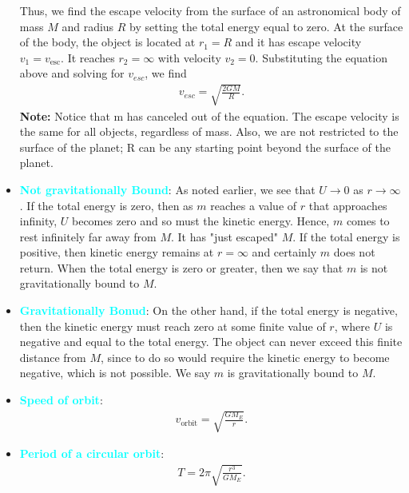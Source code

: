 \documentclass{report}
\begin{document}
\begin{itemize}
            \bigbreak \noindent 
            Thus, we find the escape velocity from the surface of an astronomical body of mass \(M\) and radius \(R\) by setting the total energy equal to zero. At the surface of the body, the object is located at \(r_1 = R\) and it has escape velocity \(v_1 = v_{\text{esc}}\). It reaches \(r_2 = \infty\) with velocity \(v_2 = 0\). Substituting the equation above and solving for $v_{esc}$, we find
            \begin{align*}
                v_{esc} = \sqrt{\frac{2GM}{R}}
            .\end{align*}
            \bigbreak \noindent 
            \textbf{Note:} Notice that m has canceled out of the equation. The escape velocity is the same for all objects, regardless of mass. Also, we are not restricted to the surface of the planet; R can be any starting point beyond the surface of the planet.
        \item \textbf{\textcolor{cyan}{Not gravitationally Bound}}: 
            As noted earlier, we see that \(U \rightarrow 0\) as \(r \rightarrow \infty\). If the total energy is zero, then as \(m\) reaches a value of \(r\) that approaches infinity, \(U\) becomes zero and so must the kinetic energy. Hence, \(m\) comes to rest infinitely far away from \(M\). It has "just escaped" \(M\). If the total energy is positive, then kinetic energy remains at \(r = \infty\) and certainly \(m\) does not return. When the total energy is zero or greater, then we say that \(m\) is not gravitationally bound to \(M\).
        \item \textbf{\textcolor{cyan}{Gravitationally Bonud}}:
            On the other hand, if the total energy is negative, then the kinetic energy must reach zero at some finite value of \(r\), where \(U\) is negative and equal to the total energy. The object can never exceed this finite distance from \(M\), since to do so would require the kinetic energy to become negative, which is not possible. We say \(m\) is gravitationally bound to \(M\).
        \item \textbf{\textcolor{cyan}{Speed of orbit}}:
            \begin{align*}
                v_{\text{orbit}} = \sqrt{\frac{GM_{E}}{r}}
            .\end{align*}
        \item \textbf{\textcolor{cyan}{Period of a circular orbit}}:
            \begin{align*}
                T = 2\pi \sqrt{\frac{r^{3}}{GM_{E}}}
            .\end{align*}

\end{itemize}
\end{document}
